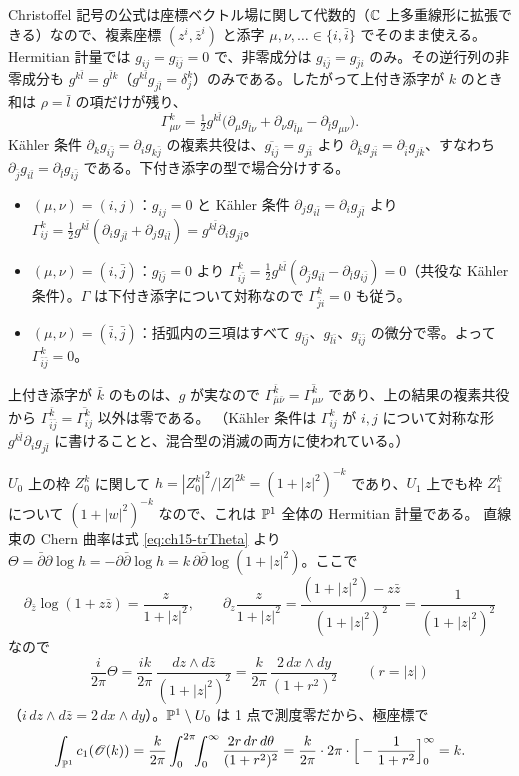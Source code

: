 Christoffel 記号の公式は座標ベクトル場に関して代数的（$\mathbb{C}$ 上多重線形に拡張できる）なので、複素座標 $(z^i,\bar z^i)$ と添字 $\mu,\nu,\ldots\in\{i,\bar i\}$ でそのまま使える。
Hermitian 計量では $g_{ij} = g_{\bar i\bar j} = 0$ で、非零成分は $g_{i\bar j} = g_{\bar ji}$ のみ。その逆行列の非零成分も $g^{k\bar l} = g^{\bar lk}$（$g^{k\bar l}g_{j\bar l} = \delta^k_j$）のみである。したがって上付き添字が $k$ のとき和は $\rho = \bar l$ の項だけが残り、
\[
\Gamma^k_{\mu\nu} = \tfrac12 g^{k\bar l}\big(\partial_\mu g_{\bar l\nu} + \partial_\nu g_{\bar l\mu} - \partial_{\bar l}g_{\mu\nu}\big).
\]
K\"ahler 条件 $\partial_kg_{i\bar j} = \partial_ig_{k\bar j}$ の複素共役は、$\overline{g_{i\bar j}} = g_{j\bar i}$ より $\partial_{\bar k}g_{j\bar i} = \partial_{\bar i}g_{j\bar k}$、すなわち $\partial_{\bar j}g_{i\bar l} = \partial_{\bar l}g_{i\bar j}$ である。下付き添字の型で場合分けする。
\begin{itemize}
\item $(\mu,\nu) = (i,j)$：$g_{ij} = 0$ と K\"ahler 条件 $\partial_jg_{i\bar l} = \partial_ig_{j\bar l}$ より
$\Gamma^k_{ij} = \frac12g^{k\bar l}(\partial_ig_{j\bar l} + \partial_jg_{i\bar l}) = g^{k\bar l}\partial_ig_{j\bar l}$。
\item $(\mu,\nu) = (i,\bar j)$：$g_{\bar l\bar j} = 0$ より $\Gamma^k_{i\bar j} = \frac12g^{k\bar l}(\partial_{\bar j}g_{i\bar l} - \partial_{\bar l}g_{i\bar j}) = 0$（共役な K\"ahler 条件）。$\Gamma$ は下付き添字について対称なので $\Gamma^k_{\bar ji} = 0$ も従う。
\item $(\mu,\nu) = (\bar i,\bar j)$：括弧内の三項はすべて $g_{\bar l\bar j}$、$g_{\bar l\bar i}$、$g_{\bar i\bar j}$ の微分で零。よって $\Gamma^k_{\bar i\bar j} = 0$。
\end{itemize}
上付き添字が $\bar k$ のものは、$g$ が実なので $\Gamma^{\bar k}_{\bar\mu\bar\nu} = \overline{\Gamma^k_{\mu\nu}}$ であり、上の結果の複素共役から $\Gamma^{\bar k}_{\bar i\bar j} = \overline{\Gamma^k_{ij}}$ 以外は零である。
（K\"ahler 条件は $\Gamma^k_{ij}$ が $i,j$ について対称な形 $g^{k\bar l}\partial_ig_{j\bar l}$ に書けることと、混合型の消滅の両方に使われている。）

$U_0$ 上の枠 $Z_0^k$ に関して $h = |Z_0^k|^2/|Z|^{2k} = (1+|z|^2)^{-k}$ であり、$U_1$ 上でも枠 $Z_1^k$ について $(1+|w|^2)^{-k}$ なので、これは $\mathbb{P}^1$ 全体の Hermitian 計量である。
直線束の Chern 曲率は式 \eqref{eq:ch15-trTheta} より $\Theta = \bar\partial\partial\log h = -\partial\bar\partial\log h = k\,\partial\bar\partial\log(1+|z|^2)$。ここで
\[
\partial_{\bar z}\log(1+z\bar z) = \frac{z}{1+|z|^2},\qquad
\partial_z\frac{z}{1+|z|^2} = \frac{(1+|z|^2) - z\bar z}{(1+|z|^2)^2} = \frac{1}{(1+|z|^2)^2}
\]
なので
\[
\frac{i}{2\pi}\Theta = \frac{ik}{2\pi}\,\frac{dz\wedge d\bar z}{(1+|z|^2)^2} = \frac{k}{2\pi}\,\frac{2\,dx\wedge dy}{(1+r^2)^2}\qquad(r = |z|)
\]
（$i\,dz\wedge d\bar z = 2\,dx\wedge dy$）。$\mathbb{P}^1\setminus U_0$ は 1 点で測度零だから、極座標で
\[
\int_{\mathbb{P}^1}c_1(\mathscr{O}(k)) = \frac{k}{2\pi}\int_0^{2\pi}\!\!\int_0^\infty\frac{2r\,dr\,d\theta}{(1+r^2)^2}
= \frac{k}{2\pi}\cdot2\pi\cdot\Big[-\frac{1}{1+r^2}\Big]_0^\infty = k .
\]

